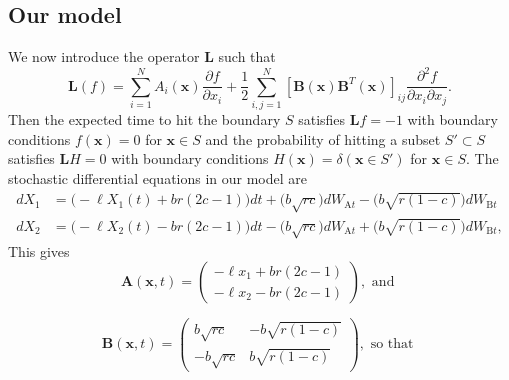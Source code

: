 \documentclass{article}
\newcommand{\mb}{\mathbf}
\begin{document}
\subsection{Our model }
We now introduce the operator ${\mb L}$ such that 
\begin{equation*}
{\mb L}(f)=\sum_{i=1}^NA_i({\mb x})\frac{\partial f}{\partial x_i}+\frac{1}{2}\sum_{i,j=1}^N[{\mb B}({\mb x}){\mb B}^T({\mb x})]_{ij}\frac{\partial ^2 f}{\partial x_i\partial x_j}. %
\end{equation*}
Then the expected time to hit the boundary $S$ satisfies ${\mb L}f=-1$ with boundary conditions $f({\mb x})=0$ for ${\mb x}\in S$ and the probability of hitting a subset $S'\subset S$ satisfies ${\mb L}H=0$ with boundary conditions $H({\mb x})=\delta({\mb x}\in S')$ for ${\mb x}\in S$.
The stochastic differential equations in our model are
\begin{equation*}
\begin{array}{ll}
dX_1&=\bigg(-\ell X_1(t)+br(2c-1)\bigg)dt+\bigg(b\sqrt{rc}\bigg)dW_{\text{A}t}-\bigg(b\sqrt{r(1-c)}\bigg)dW_{\text{B}t}
\\dX_2&=\bigg(-\ell X_2(t)-br(2c-1)\bigg)dt-\bigg(b\sqrt{rc}\bigg)dW_{\text{A}t}+\bigg(b\sqrt{r(1-c)}\bigg)dW_{\text{B}t},
\end{array}
\end{equation*}
This gives 
\begin{equation*}
{\mb A}({\mb x},t)=\left(\begin{array}{ll} 
-\ell x_1+br(2c-1)
\\ -\ell x_2-br(2c-1)
\end{array}\right), \text{ and }
\end{equation*}

\begin{equation*}
{\mb B}({\mb x},t)=\left(\begin{array}{ll} 
b\sqrt{rc} & -b\sqrt{r(1-c)}
\\ -b\sqrt{rc} & b\sqrt{r(1-c)}
\end{array}\right), \text{ so that }
\end{equation*}
\end{document}
